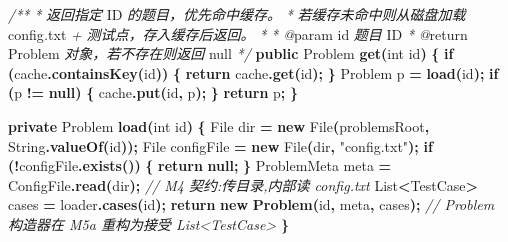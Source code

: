 \documentclass[
  11pt,
]{ctexart}
\newenvironment{Shaded}{\begin{snugshade}}{\end{snugshade}}
\newcommand{\BuiltInTok}[1]{#1}
\newcommand{\CommentTok}[1]{\textcolor[rgb]{0.56,0.35,0.01}{\textit{#1}}}
\newcommand{\ControlFlowTok}[1]{\textcolor[rgb]{0.13,0.29,0.53}{\textbf{#1}}}
\newcommand{\DataTypeTok}[1]{\textcolor[rgb]{0.13,0.29,0.53}{#1}}
\newcommand{\FunctionTok}[1]{\textcolor[rgb]{0.13,0.29,0.53}{\textbf{#1}}}
\newcommand{\KeywordTok}[1]{\textcolor[rgb]{0.13,0.29,0.53}{\textbf{#1}}}
\newcommand{\NormalTok}[1]{#1}
\newcommand{\OperatorTok}[1]{\textcolor[rgb]{0.81,0.36,0.00}{\textbf{#1}}}
\newcommand{\StringTok}[1]{\textcolor[rgb]{0.31,0.60,0.02}{#1}}
\begin{document}
\begin{Shaded}
\begin{Highlighting}[]
    \CommentTok{/**}
     \CommentTok{*} \CommentTok{返回指定}\NormalTok{ ID }\CommentTok{的题目，优先命中缓存。}
     \CommentTok{*} \CommentTok{若缓存未命中则从磁盘加载}\NormalTok{ config}\CommentTok{.}\NormalTok{txt }\CommentTok{+} \CommentTok{测试点，存入缓存后返回。}
     \CommentTok{*}
\CommentTok{     * @}\NormalTok{param id }\CommentTok{题目}\NormalTok{ ID}
     \CommentTok{*} \CommentTok{@}\NormalTok{return Problem }\CommentTok{对象，若不存在则返回}\NormalTok{ null}
     \CommentTok{*/}
    \KeywordTok{public}\NormalTok{ Problem }\FunctionTok{get}\OperatorTok{(}\DataTypeTok{int}\NormalTok{ id}\OperatorTok{)} \OperatorTok{\{}
        \ControlFlowTok{if} \OperatorTok{(}\NormalTok{cache}\OperatorTok{.}\FunctionTok{containsKey}\OperatorTok{(}\NormalTok{id}\OperatorTok{))} \OperatorTok{\{}
            \ControlFlowTok{return}\NormalTok{ cache}\OperatorTok{.}\FunctionTok{get}\OperatorTok{(}\NormalTok{id}\OperatorTok{);}
        \OperatorTok{\}}
\NormalTok{        Problem p }\OperatorTok{=} \FunctionTok{load}\OperatorTok{(}\NormalTok{id}\OperatorTok{);}
        \ControlFlowTok{if} \OperatorTok{(}\NormalTok{p }\OperatorTok{!=} \KeywordTok{null}\OperatorTok{)} \OperatorTok{\{}
\NormalTok{            cache}\OperatorTok{.}\FunctionTok{put}\OperatorTok{(}\NormalTok{id}\OperatorTok{,}\NormalTok{ p}\OperatorTok{);}
        \OperatorTok{\}}
        \ControlFlowTok{return}\NormalTok{ p}\OperatorTok{;}
    \OperatorTok{\}}

    \KeywordTok{private}\NormalTok{ Problem }\FunctionTok{load}\OperatorTok{(}\DataTypeTok{int}\NormalTok{ id}\OperatorTok{)} \OperatorTok{\{}
        \BuiltInTok{File}\NormalTok{ dir }\OperatorTok{=} \KeywordTok{new} \BuiltInTok{File}\OperatorTok{(}\NormalTok{problemsRoot}\OperatorTok{,} \BuiltInTok{String}\OperatorTok{.}\FunctionTok{valueOf}\OperatorTok{(}\NormalTok{id}\OperatorTok{));}
        \BuiltInTok{File}\NormalTok{ configFile }\OperatorTok{=} \KeywordTok{new} \BuiltInTok{File}\OperatorTok{(}\NormalTok{dir}\OperatorTok{,} \StringTok{"config.txt"}\OperatorTok{);}
        \ControlFlowTok{if} \OperatorTok{(!}\NormalTok{configFile}\OperatorTok{.}\FunctionTok{exists}\OperatorTok{())} \OperatorTok{\{}
            \ControlFlowTok{return} \KeywordTok{null}\OperatorTok{;}
        \OperatorTok{\}}
\NormalTok{        ProblemMeta meta }\OperatorTok{=}\NormalTok{ ConfigFile}\OperatorTok{.}\FunctionTok{read}\OperatorTok{(}\NormalTok{dir}\OperatorTok{);}  \CommentTok{// M4 契约:传目录,内部读 config.txt}
        \BuiltInTok{List}\OperatorTok{\textless{}}\NormalTok{TestCase}\OperatorTok{\textgreater{}}\NormalTok{ cases }\OperatorTok{=}\NormalTok{ loader}\OperatorTok{.}\FunctionTok{cases}\OperatorTok{(}\NormalTok{id}\OperatorTok{);}
        \ControlFlowTok{return} \KeywordTok{new} \FunctionTok{Problem}\OperatorTok{(}\NormalTok{id}\OperatorTok{,}\NormalTok{ meta}\OperatorTok{,}\NormalTok{ cases}\OperatorTok{);}
        \CommentTok{// Problem 构造器在 M5a 重构为接受 List\textless{}TestCase\textgreater{}}
    \OperatorTok{\}}


\end{Highlighting}
\end{Shaded}
\end{document}
